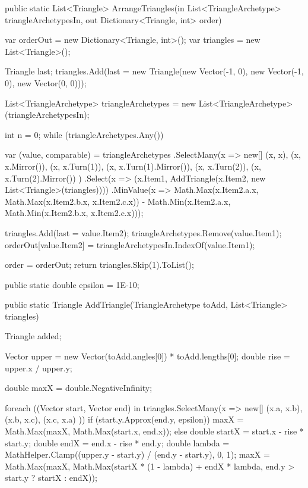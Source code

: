 \documentclass[12pt]{article}
\begin{document}
\begin{Csharp}[caption=static class TriangleArranger]
public static List<Triangle> ArrangeTriangles(in List<TriangleArchetype> triangleArchetypesIn, out Dictionary<Triangle, int> order)
{
    var orderOut = new Dictionary<Triangle, int>();
    var triangles = new List<Triangle>();

    Triangle last;
    triangles.Add(last = new Triangle(new Vector(-1, 0), new Vector(-1, 0), new Vector(0, 0)));

    List<TriangleArchetype> triangleArchetypes = new List<TriangleArchetype>(triangleArchetypesIn);

    int n = 0;
    while (triangleArchetypes.Any())
    {
        var (value, comparable) = triangleArchetypes
            .SelectMany(x => new[] { (x, x), (x, x.Mirror()), (x, x.Turn(1)), (x, x.Turn(1).Mirror()), (x, x.Turn(2)), (x, x.Turn(2).Mirror()) })
            .Select(x => (x.Item1, AddTriangle(x.Item2, new List<Triangle>(triangles))))
            .MinValue(x => Math.Max(x.Item2.a.x, Math.Max(x.Item2.b.x, x.Item2.c.x)) - Math.Min(x.Item2.a.x, Math.Min(x.Item2.b.x, x.Item2.c.x)));

        triangles.Add(last = value.Item2);
        triangleArchetypes.Remove(value.Item1);
        orderOut[value.Item2] = triangleArchetypesIn.IndexOf(value.Item1);
    }

    order = orderOut;
    return triangles.Skip(1).ToList();
}

public static double epsilon = 1E-10;

public static Triangle AddTriangle(TriangleArchetype toAdd, List<Triangle> triangles)
{
    Triangle added;

    Vector upper = new Vector(toAdd.angles[0]) * toAdd.lengths[0];
    double rise = upper.x / upper.y;

    double maxX = double.NegativeInfinity;

    foreach ((Vector start, Vector end) in triangles.SelectMany(x => new[] { (x.a, x.b), (x.b, x.c), (x.c, x.a) }))
    {
        if (start.y.Approx(end.y, epsilon)) maxX = Math.Max(maxX, Math.Max(start.x, end.x));
        else
        {
            double startX = start.x - rise * start.y;
            double endX = end.x - rise * end.y;
            double lambda = MathHelper.Clamp((upper.y - start.y) / (end.y - start.y), 0, 1);
            maxX = Math.Max(maxX, Math.Max(startX * (1 - lambda) + endX * lambda, end.y > start.y ? startX : endX));
        }
    }

}
\end{Csharp}
\end{document}
